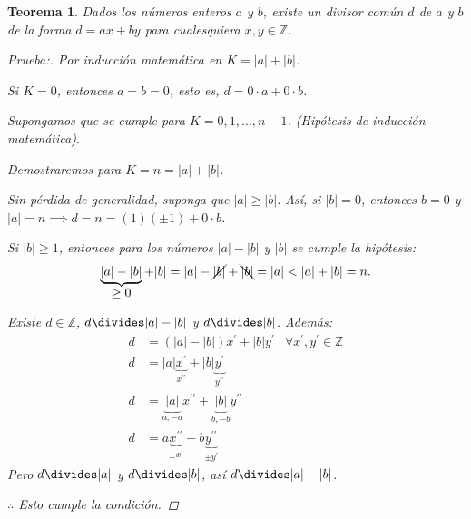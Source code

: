 \documentclass[oneside,a5paper]{memoir}
\newtheorem{theorem}{Teorema}[chapter] %
\begin{document}
\begin{theorem}\label{teo:1.1}
Dados los números enteros $a$ y $b$, existe un divisor común $d$ de $a$ y $b$ de la forma $d=ax+by$ para cualesquiera $x,y\in\mathbb{Z}$.
\begin{proof}[Prueba:]
	 Por inducción matemática en $K=|a|+|b|$.
	 
	 Si $K=0$, entonces $a=b=0$, esto es, $d=0\cdot a+0\cdot b$. \checkmark
	 
	 \noindent
	 Supongamos que se cumple para $K=0,1,\ldots,n-1$. (Hipótesis de inducción matemática).
	 
	 Demostraremos para $\boxed{K=n=|a|+|b|}$.
	 
	 \noindent
	 Sin pérdida de generalidad, suponga que $|a|\geq|b|$. Así, si $|b|=0$, entonces $b=0$ y $|a|=n\implies d=n=(1)(\pm1)+0\cdot b$.
	 
	 Si $|b|\geq1$, entonces para los números $|a|-|b|$ y $|b|$ se cumple la hipótesis:
	 \[\underbrace{|a|-|b|}_{\displaystyle\geq0}+|b|=|a|-\cancel{|b|}+\bcancel{|b|}=|a|<|a|+|b|=n.\]
	 
	 Existe $d\in\mathbb{Z}$, $d\divides |a|-|b|$ y $d\divides |b|$. Además:
	 \begin{align*}
	 	d&=\left(|a|-|b|\right)x^{\prime}+|b|y^{\prime}&\forall x^{\prime},y^{\prime}\in\mathbb{Z}\\
	 	d&=|a|\underbrace{x^{\prime}}_{\displaystyle x^{\prime\prime}}+|b|\underbrace{y^{\prime}}_{\displaystyle y^{\prime\prime}}&\\
	 	d&=\underbrace{|a|}_{a,-a}x^{\prime\prime}+\underbrace{|b|}_{b,-b}y^{\prime\prime}&\\
	 	d&=a\underbrace{x^{\prime\prime}}_{\pm x^{\prime}}+b\underbrace{y^{\prime\prime}}_{\pm y^{\prime}}&
	 \end{align*}
	 Pero $d\divides |a|$ y $d\divides |b|$, así $d\divides |a|-|b|$.
	 
	 \noindent
	 $\therefore$ Esto cumple la condición.
	\end{proof}
\end{theorem}
\end{document}
